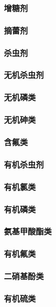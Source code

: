 \documentclass[UTF8]{../../ApplicationUniverse}
\begin{document}
    \subsubsection{增糖剂}
    \subsubsection{摘蕾剂}
\subsubsection{杀虫剂}
    \subsubsection{无机杀虫剂}
        \subsubsection{无机磷类}
        \subsubsection{无机砷类}
        \subsubsection{含氟类}
    \subsubsection{有机杀虫剂}
        \subsubsection{有机氯类}
        \subsubsection{有机磷类}
        \subsubsection{氨基甲酸酯类}
        \subsubsection{有机氟类}
        \subsubsection{二硝基酚类}
        \subsubsection{有机硫类}
\end{document}
